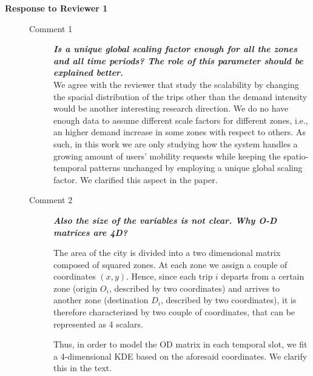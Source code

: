 \documentclass{paper}
\newcommand{\rev}[1]{\textbf{\textit{#1}}}
\newcommand{\ans}[1]{{\color{blue} #1}}
\begin{document}
\begin{description}

 \item[\textbf{Response to Reviewer 1}] \hfill
\begin{description}
 \item[Comment 1] \rev{Is a unique global scaling factor enough for all the zones and all time periods? The role of this parameter should be explained better.}\\
 
 
\ans{We agree with the reviewer that study the scalability by changing the spacial distribution of the trips other than the demand intensity would be another interesting research direction. We do no have enough data to assume different scale factors for different zones, i.e., an higher demand increase in some zones with respect to others.
As such, in this work we are only studying how the system handles a growing amount of users' mobility requests while keeping the spatio-temporal patterns unchanged by employing a unique global scaling factor.
We clarified this aspect in the paper.
 }\\

 
 \item[Comment 2] \rev{Also the size of the variables is not clear. Why O-D matrices are 4D?} \\
 
\ans{The area of the city is divided into a two dimensional matrix composed of squared zones. At each zone we assign a couple of coordinates $(x,y)$. Hence, since each trip $i$ departs from a certain zone (origin $O_i$, described by two coordinates) and arrives to another zone (destination $D_i$, described by two coordinates), it is therefore characterized by two couple of coordinates, that can be represented as 4 scalars. 

Thus, in order to model the OD matrix in each temporal slot, we fit a 4-dimensional KDE based on the aforesaid coordinates. We clarify this in the text.} \\


\end{description}
\end{description}
\end{document}
